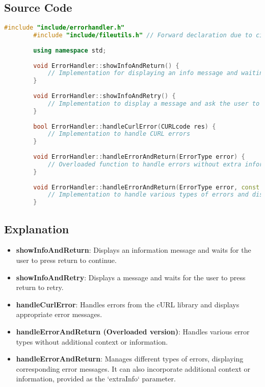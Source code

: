 \documentclass{article}
\begin{document}
	\subsection*{Source Code}
	\begin{lstlisting}[language=C++]
		#include "include/errorhandler.h"
		#include "include/fileutils.h" // Forward declaration due to circular dependency
		
		using namespace std;
		
		void ErrorHandler::showInfoAndReturn() {
			// Implementation for displaying an info message and waiting for user action
		}
		
		void ErrorHandler::showInfoAndRetry() {
			// Implementation to display a message and ask the user to retry
		}
		
		bool ErrorHandler::handleCurlError(CURLcode res) {
			// Implementation to handle CURL errors
		}
		
		void ErrorHandler::handleErrorAndReturn(ErrorType error) {
			// Overloaded function to handle errors without extra information
		}
		
		void ErrorHandler::handleErrorAndReturn(ErrorType error, const string& extraInfo = "") {
			// Implementation to handle various types of errors and display appropriate messages
		}
	\end{lstlisting}
	
	\subsection*{Explanation}
	\begin{itemize}
		\item \textbf{showInfoAndReturn}: Displays an information message and waits for the user to press return to continue.
		\item \textbf{showInfoAndRetry}: Displays a message and waits for the user to press return to retry.
		\item \textbf{handleCurlError}: Handles errors from the cURL library and displays appropriate error messages.
		\item \textbf{handleErrorAndReturn (Overloaded version)}: Handles various error types without additional context or information.
		\item \textbf{handleErrorAndReturn}: Manages different types of errors, displaying corresponding error messages. It can also incorporate additional context or information, provided as the `extraInfo` parameter.
	\end{itemize}
	
\end{document}
